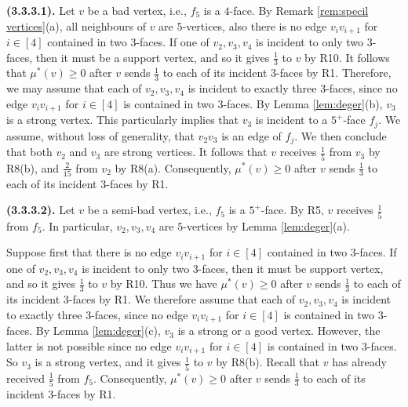 \documentclass[12pt, reqno]{amsart}
\theoremstyle{plain}
\theoremstyle{definition}
\numberwithin{equation}{section}
\begin{document}
\textbf{(3.3.3.1).} Let $v$ be a bad vertex, i.e., $f_5$ is a $4$-face. By Remark \ref{rem:specil vertices}(a), all neighbours of $v$ are  $5$-vertices, also there is no edge $v_iv_{i+1}$ for $i\in [4]$ contained in two $3$-faces.
If one of $v_2,v_3,v_4$ is incident to only two $3$-faces, then it must be a support vertex, and so it gives $\frac{1}{3}$ to $v$ by R10. It follows that  $\mu^*(v)\geq 0$ after $v$ sends $\frac{1}{3}$ to each of its incident $3$-faces by R1. Therefore, we may assume that each of $v_2,v_3,v_4$ is incident to exactly three $3$-faces, since no edge $v_iv_{i+1}$ for $i\in [4]$ is contained in two $3$-faces. By Lemma \ref{lem:deger}(b), $v_3$ is a strong vertex. This particularly implies that $v_3$ is incident to a $5^+$-face $f_j$. %
We assume, without loss of generality, that  $v_2v_3$ is an edge  of $f_j$. We then conclude that both $v_2$ and $v_3$ are strong vertices. It follows that $v$ receives  $\frac{1}{5}$ from $v_3$ by R8(b), and $\frac{2}{15}$ from $v_2$ by R8(a).  Consequently,  $\mu^*(v)\geq 0$ after $v$ sends $\frac{1}{3}$ to each of its incident $3$-faces by R1. \medskip

\textbf{(3.3.3.2).}  Let $v$ be a semi-bad vertex, i.e., $f_5$ is a $5^+$-face. %
By R5, $v$ receives $\frac{1}{5}$ from $f_5$. %
In particular, $v_2,v_3,v_4$ are $5$-vertices by Lemma \ref{lem:deger}(a).


Suppose first that there is no edge $v_iv_{i+1}$ for $i\in [4]$ contained in two $3$-faces.  If one of $v_2,v_3,v_4$ is incident to only two $3$-faces, then it must be support vertex, and so it gives $\frac{1}{3}$ to $v$ by R10. Thus we have  $\mu^*(v)\geq 0$ after $v$ sends $\frac{1}{3}$ to each of its incident $3$-faces by R1. We therefore assume that each of $v_2,v_3,v_4$ is incident to exactly three $3$-faces, since no edge $v_iv_{i+1}$ for $i\in [4]$ is contained in two $3$-faces.
By Lemma \ref{lem:deger}(c), $v_3$ is a strong or a good vertex. However, the latter is not possible since no edge $v_iv_{i+1}$ for $i\in [4]$ is contained in two $3$-faces. So $v_3$ is a strong vertex, and it gives  $\frac{1}{5}$ to $v$ by R8(b). Recall that $v$ has already received $\frac{1}{5}$ from $f_5$. Consequently,  $\mu^*(v)\geq 0$ after $v$ sends $\frac{1}{3}$ to each of its incident $3$-faces by R1. 
\end{document}
